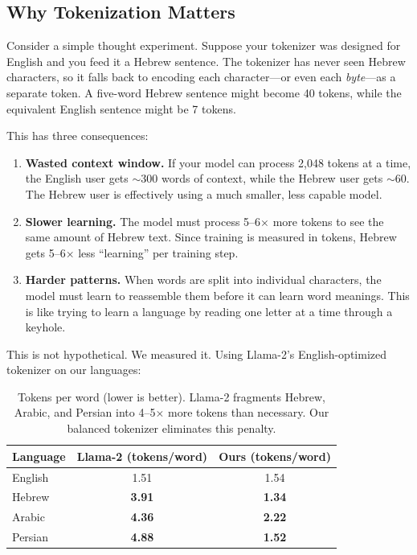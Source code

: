 \documentclass[11pt,a4paper]{article}
\begin{document}
\subsection{Why Tokenization Matters}

Consider a simple thought experiment. Suppose your tokenizer was designed for English and you feed it a Hebrew sentence. The tokenizer has never seen Hebrew characters, so it falls back to encoding each character---or even each \emph{byte}---as a separate token. A five-word Hebrew sentence might become 40 tokens, while the equivalent English sentence might be 7 tokens.

This has three consequences:

\begin{enumerate}
    \item \textbf{Wasted context window.} If your model can process 2,048 tokens at a time, the English user gets $\sim$300 words of context, while the Hebrew user gets $\sim$60. The Hebrew user is effectively using a much smaller, less capable model.
    
    \item \textbf{Slower learning.} The model must process 5--6$\times$ more tokens to see the same amount of Hebrew text. Since training is measured in tokens, Hebrew gets 5--6$\times$ less ``learning'' per training step.
    
    \item \textbf{Harder patterns.} When words are split into individual characters, the model must learn to reassemble them before it can learn word meanings. This is like trying to learn a language by reading one letter at a time through a keyhole.
\end{enumerate}

This is not hypothetical. We measured it. Using Llama-2's English-optimized tokenizer on our languages:

\begin{table}[H]
\centering
\begin{tabular}{lcc}
\toprule
\textbf{Language} & \textbf{Llama-2 (tokens/word)} & \textbf{Ours (tokens/word)} \\
\midrule
English & 1.51 & 1.54 \\
Hebrew & \textbf{3.91} & \textbf{1.34} \\
Arabic & \textbf{4.36} & \textbf{2.22} \\
Persian & \textbf{4.88} & \textbf{1.52} \\
\bottomrule
\end{tabular}
\caption{Tokens per word (lower is better). Llama-2 fragments Hebrew, Arabic, and Persian into 4--5$\times$ more tokens than necessary. Our balanced tokenizer eliminates this penalty.}
\label{tab:tokenizer_motivation}
\end{table}
\end{document}
